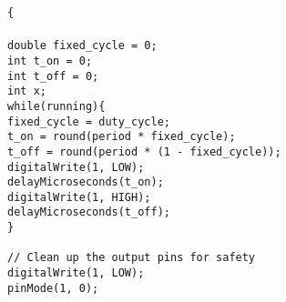 \documentclass[a4paper, 12pt]{article}
\begin{document}
\begin{appendices}
	\texttt{\{ \\\noindent}
	\texttt{ \\\noindent}
	\texttt{\hspace*{1em}double fixed\_cycle = 0;} \\\noindent
	\texttt{\hspace*{1em}int t\_on = 0;} \\\noindent
	\texttt{\hspace*{1em}int t\_off = 0;} \\\noindent
	\texttt{\hspace*{1em}int x;} \\\noindent
	\texttt{\hspace*{1em}while(running)\{ \\\noindent}
	\texttt{\hspace*{2em}fixed\_cycle = duty\_cycle;} \\\noindent
	\texttt{\hspace*{2em}t\_on = round(period * fixed\_cycle);} \\\noindent
	\texttt{\hspace*{2em}t\_off = round(period * (1 - fixed\_cycle));} \\\noindent
	\texttt{\hspace*{2em}digitalWrite(1, LOW);} \\\noindent
	\texttt{\hspace*{2em}delayMicroseconds(t\_on);} \\\noindent
	\texttt{\hspace*{2em}digitalWrite(1, HIGH);} \\\noindent
	\texttt{\hspace*{2em}delayMicroseconds(t\_off);} \\\noindent
      \texttt{\hspace*{1em}\}} \\\noindent
	\texttt{\hspace*{1em}	} \\\noindent
	\texttt{\hspace*{1em}// Clean up the output pins for safety} \\\noindent
	\texttt{\hspace*{1em}digitalWrite(1, LOW);} \\\noindent
	\texttt{\hspace*{1em}pinMode(1, 0);} \\\noindent
	\texttt{\hspace*{1em}}\\\noindent
        \texttt{ \\\noindent}

\end{appendices}
\end{document}
